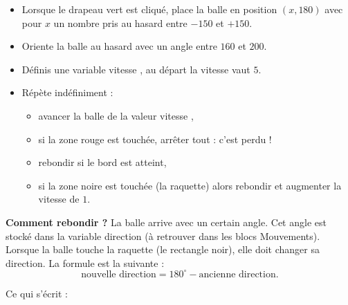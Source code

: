 \documentclass[class=report,crop=false, 12pt]{standalone}
\begin{document}
\begin{activite}
\begin{itemize}
  \item Lorsque le drapeau vert est cliqué, place la balle en position $(x , 180)$ avec pour $x$ un nombre pris au hasard entre $-150$ et $+150$.
  \item Oriente la balle au hasard avec un angle entre $160$ et $200$.
  \item Définis une variable \og vitesse \fg{}, au départ la vitesse vaut $5$. 
  \item Répète indéfiniment :
  \begin{itemize}
    \item avancer la balle de la valeur \og vitesse \fg{},
    \item si la zone rouge est touchée, arrêter tout : c'est perdu !
    \item rebondir si le bord est atteint,  
    \item si la zone noire est touchée (la raquette) alors rebondir et augmenter la vitesse de $1$.      
  \end{itemize}
\end{itemize}

\bigskip
\textbf{Comment rebondir ?}
La balle arrive avec un certain angle. Cet angle est stocké dans la variable \og direction \fg{} (à retrouver dans les blocs \og{}Mouvements\fg{}).
Lorsque la balle touche la raquette (le rectangle noir), elle doit changer sa direction.
La formule est la suivante :
$$\text{nouvelle direction} = 180^\circ - \text{ancienne direction}.$$


Ce qui s'écrit :
\begin{center}
\begin{scratch}
\end{scratch}
\end{center}

\end{activite}
\end{document}
